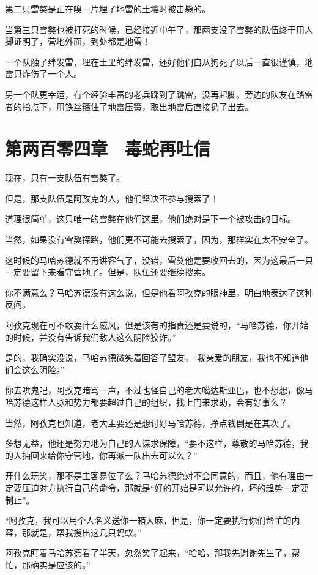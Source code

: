 第二只雪獒是正在嗅一片埋了地雷的土壤时被击毙的。

当第三只雪獒也被打死的时候，已经接近中午了，那两支没了雪獒的队伍终于用人脚证明了，营地外面，到处都是地雷！

一个队触了绊发雷，埋在土里的绊发雷，还好他们自从狗死了以后一直很谨慎，地雷只炸伤了一个人。

另一个队更幸运，有个经验丰富的老兵踩到了跳雷，没再起脚。旁边的队友在踏雷者的指点下，用铁丝箍住了地雷压簧，取出地雷后直接扔了出去。

\section{第两百零四章　毒蛇再吐信}

现在，只有一支队伍有雪獒了。

但是，那支队伍是阿孜克的人，他们坚决不参与搜索了！

道理很简单，这只唯一的雪獒在他们这里，他们绝对是下一个被攻击的目标。

当然，如果没有雪獒探路，他们更不可能去搜索了，因为，那样实在太不安全了。

这时候的马哈苏德就不再讲客气了，没错，雪獒他是要收回去的，因为这最后一只一定要留下来看守营地了。但是，队伍还要继续搜索。

你不满意么？马哈苏德没有这么说，但是他看阿孜克的眼神里，明白地表达了这种反问。

阿孜克现在可不敢耍什么威风，但是该有的指责还是要说的，“马哈苏德，你开始的时候，并没有告诉我们敌人这么阴险狡诈。”

是的，我确实没说，马哈苏德微笑着回答了盟友，“我亲爱的朋友，我也不知道他们会这么阴险。”

你去哄鬼吧，阿孜克暗骂一声，不过也怪自己的老大噶达斯亚巴，也不想想，像马哈苏德这样人脉和势力都要超过自己的组织，找上门来求助，会有好事么？

当然，阿孜克也知道，老大主要还是想讨好马哈苏德，挣点钱倒是在其次了。

多想无益，他还是努力地为自己的人谋求保障，“要不这样，尊敬的马哈苏德，我的人抽回来给你守营地，你再派一队出去可以么？”

开什么玩笑，那不是主客易位了么？马哈苏德绝对不会同意的，而且，他有理由一定要压迫对方执行自己的命令，那就是“好的开始是可以允许的，坏的趋势一定要制止”。

“阿孜克，我可以用个人名义送你一箱大麻，但是，你一定要执行你们帮忙的内容，那就是，帮我搜出这几只蚂蚁。”

阿孜克盯着马哈苏德看了半天，忽然笑了起来，“哈哈，那我先谢谢先生了，帮忙，那确实是应该的。”

